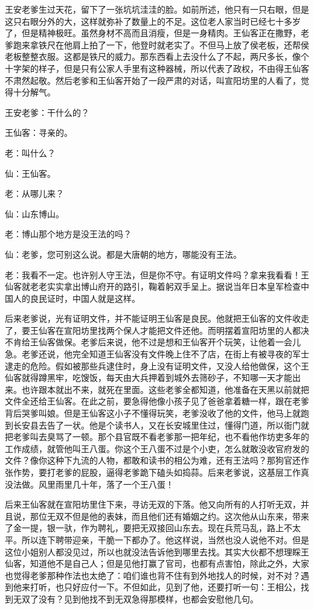 王安老爹生过天花，留下了一张坑坑洼洼的脸。如前所述，他只有一只右眼，但是这只右眼分外的大，这样就弥补了数量上的不足。这位老人家当时已经七十多岁了，但是精神极旺。虽然身材不高而且消瘦，但是一身精肉。王仙客正在撒野，老爹跑来拿铁尺在他肩上拍了一下，他登时就老实了。不但马上放了侯老板，还帮侯老板整整衣服。这都是铁尺的威力。那东西看上去没什么了不起，两尺多长，像个十字架的样子，但是只有公家人手里有这种器械，所以代表了政权，不由得王仙客不肃然起敬。然后老爹和王仙客开始了一段严肃的对话，叫宣阳坊里的人看了，觉得十分解气。 

王安老爹：干什么的？ 

王仙客：寻亲的。 

老：叫什么？ 

仙：王仙客。 

老：从哪儿来？ 

仙：山东博山。 

老：博山那个地方是没王法的吗？ 

仙：老爹，您可别这么说。都是大唐朝的地方，哪能没有王法。 

老：我看不一定。也许别人守王法，但是你不守。有证明文件吗？拿来我看看！王仙客就老老实实拿出博山府开的路引，鞠着躬双手呈上。据说当年日本皇军检查中国人的良民证时，中国人就是这样。 

后来老爹说，光有证明文件，并不能证明王仙客是良民。他就把王仙客的文件收走了，要王仙客在宣阳坊里找两个保人才能把文件还他。而明摆着宣阳坊里的人都决不肯给王仙客做保。老爹后来说，他不过是想和王仙客开个玩笑，让他着一会儿急。老爹还说，他完全知道王仙客没有文件晚上住不了店，在街上有被寻夜的军士逮走的危险。假如被那些兵逮住时，身上没有证明文件，又没人给他做保，这个王仙客就得蹲黑牢，吃馊饭，每天由大兵押着到城外去筛砂子，不知哪一天才能出来。也许跟本就出不来，就死在里面。这些老爹全都知道，他准备在天黑以前就把文件全还给王仙客。在此之前，要急得他像小孩子见了爸爸拿着糖一样，跟在老爹背后哭爹叫娘。但是王仙客这小子不懂得玩笑，老爹没收了他的文件，他马上就跑到长安县去告了一状。他是个读书人，又在长安城里住过，懂得门道，所以衙门就把老爹叫去臭骂了一顿。那个县官既不看老爹那一把年纪，也不看他作坊吏多年的工作成绩，就管他叫王八蛋。你这个王八蛋不过是个小吏，怎么就敢没收官府发的文件？像你这种下九流的人物，都敢和读书的相公为难，还有王法吗？那狗官还作张作势，要打老爹的屁股，逼得老爹跪下磕头如捣蒜。后来老爹说，这基层工作真没法做。风里雨里几十年，落了一个王八蛋！ 

后来王仙客就在宣阳坊里住下来，寻访无双的下落。他又向所有的人打听无双，并且说，那位无双不但是他的表妹，而且他们还有婚姻之约。这次他从山东来，带来了金一提，银一驮，作为聘礼，要把无双接回山东去。现在兵荒马乱，路上不太平。所以连下聘带迎亲，干脆一下都办了。他这样说，当然也没人说他不对。但是这位小姐别人都没见过，所以也就没法告诉他到哪里去找。其实大伙都不想理睬王仙客，知道他不是自己人；但是见他打赢了官司，也都有点害怕，除此之外，大家也觉得老爹那种作法也太绝了：咱们谁也背不住有到外地找人的时候，对不对？遇到他来打听，也只好应付一下。不但如此，见到了他，还要打听一句：王相公，找到无双了没有？见到他找不到无双急得那模样，也都会安慰他几句。 

